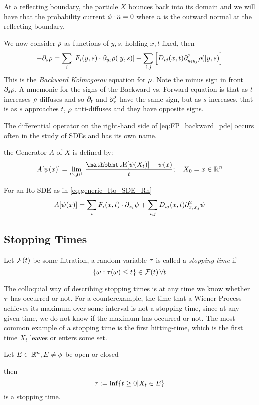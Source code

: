 At a reflecting boundary, the particle $X$ bounces back into its domain and we
will have that the probability current ${ \phi }\cdot n = 0$ where $n$ is the outward
normal at the reflecting boundary.

We now consider ${\rho}$ as functions of $y,s$, holding $x,t$ fixed, then
\begin{equation}
-{\partial}_s {\rho}= \sum_i  \left[F_i(y,s) \cdot {\partial}_{y_i}{\rho}(|y,s) \right] 
+ 
\sum_{i,j}   \left[ D_{ij}(x,t) {\partial}^2_{y_i y_j}{\rho}(|y,s) \right]
\label{eq:FP_backward_pde}
\end{equation} 
This is the \emph{Backward Kolmogorov} equation for ${\rho}$. Note the minus sign
in front ${\partial}_s {\rho}$. A mnemonic for the signs of the Backward vs. Forward
equation is that as $t$ increases ${\rho}$ diffuses and so ${\partial}_t$ and ${\partial}^2_{x}$
have the same sign, but as $s$ increases, that is as $s$ approaches $t$, ${\rho}$
anti-diffuses and they have opposite signs. 
  
The differential operator on the right-hand side of
\cref{eq:FP_backward_pde} occurs often in the study of SDEs and has its own
name.
\begin{defn} the Generator $A$ of $X$ is defined by:
$$
A[\psi(x)] = \lim_{t \searrow 0^+} \frac{\Exp[\psi(X_t)]  - \psi(x)}{t} ;  \quad X_0 =
x \in \R^n
$$
\end{defn} 
\begin{lemma} For an Ito SDE as in \cref{eq:generic_Ito_SDE_Rn} 
$$
A[\psi(x)] = \sum_i F_i(x,t) \cdot {\partial}_{x_i} \psi + \sum_{i,j} D_{ij}(x,t)
{\partial}^2_{x_i x_j}\psi $$
\end{lemma}


\subsection{Stopping Times}
\begin{defn}
Let ${\mathcal{F}}(t)$ be some filtration, a random variable ${\tau}$ is called a
\emph{stopping time} if 
$$
\{{\omega} : {\tau}({\omega}) \leq t\} \in {\mathcal{F}}(t) \, \forall t  
$$
\end{defn}
The colloquial way of describing stopping times is at any time we know
whether ${\tau}$ has occurred or not. For a counterexample, the time that a Wiener
Process achieves its maximum over some interval is not a stopping time, since at any
given time, we do not know if the maximum has occurred or not. The most common
example of a stopping time is the first hitting-time, which is the first time
$X_t$ leaves or enters some set. 
\begin{thm} Let $E \subset { \mathbb{R} }^n, E \neq
\phi$ be open or closed
 
then $${\tau} := \inf\{ t \geq 0 | X_t \in E\}$$ is a stopping time.
\end{thm}
 
